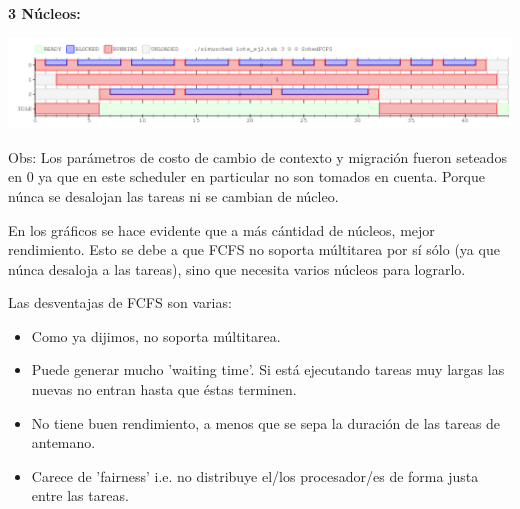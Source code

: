 \vspace{10pt}

\textbf{3 Núcleos:}
\vspace{-20pt}
\begin{center}
 \includegraphics[scale=0.5]{./FCFS/FCFS_3core.png}
\end{center}


Obs: Los parámetros de costo de cambio de contexto y migración fueron seteados en 0 ya que en este scheduler en particular
no son tomados en cuenta. Porque núnca se desalojan las tareas ni se cambian de núcleo.

En los gráficos se hace evidente que a más cántidad de núcleos, mejor rendimiento.
Esto se debe a que FCFS no soporta múltitarea por sí sólo (ya que núnca desaloja a las tareas), sino que necesita varios núcleos para lograrlo.\newline

Las desventajas de FCFS son varias:

\begin{itemize}
\item Como ya dijimos, no soporta múltitarea.
\item Puede generar mucho 'waiting time'.\newline
	Si está ejecutando tareas muy largas las nuevas no entran hasta que éstas terminen.
\item No tiene buen rendimiento, a menos que se sepa la duración de las tareas de antemano.
\item Carece de 'fairness' i.e. no distribuye el/los procesador/es de forma justa entre las tareas.
\end{itemize}